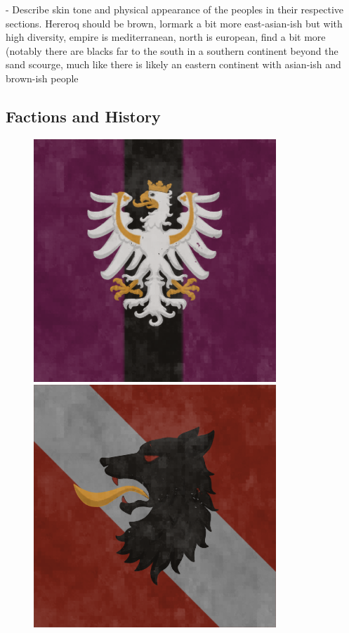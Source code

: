 - Describe skin tone and physical appearance of the peoples in their respective sections. Hereroq should be brown, lormark a bit more east-asian-ish but with high diversity, empire is mediterranean, north is european, find a bit more (notably there are blacks far to the south in a southern continent beyond the sand scourge, much like there is likely an eastern continent with asian-ish and brown-ish people







\subsection{Factions and History}

\begin{figure}[!ht]
    \centering      
        \includegraphics[scale=0.25]{img/flag/atheryn.png}
        \includegraphics[scale=0.25]{img/flag/eskand.png}

\end{figure}
